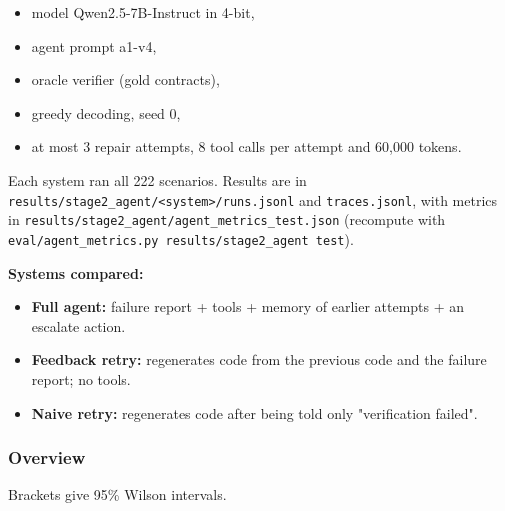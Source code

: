 \documentclass[11pt]{article}
\providecommand{\tightlist}{\setlength{\itemsep}{0pt}\setlength{\parskip}{0pt}}
\begin{document}
\begin{itemize}
\tightlist
\item
  model Qwen2.5-7B-Instruct in 4-bit,
\item
  agent prompt a1-v4,
\item
  oracle verifier (gold contracts),
\item
  greedy decoding, seed 0,
\item
  at most 3 repair attempts, 8 tool calls per attempt and 60,000 tokens.
\end{itemize}

Each system ran all 222 scenarios. Results are in
\texttt{results/\allowbreak{}stage2\_\allowbreak{}agent/\allowbreak{}<system>/\allowbreak{}runs.\allowbreak{}jsonl}
and \texttt{traces.\allowbreak{}jsonl}, with metrics in
\texttt{results/\allowbreak{}stage2\_\allowbreak{}agent/\allowbreak{}agent\_\allowbreak{}metrics\_\allowbreak{}test.\allowbreak{}json}
(recompute with
\texttt{eval/\allowbreak{}agent\_\allowbreak{}metrics.\allowbreak{}py results/\allowbreak{}stage2\_\allowbreak{}agent test}).

\textbf{Systems compared:}

\begin{itemize}
\tightlist
\item
  \textbf{Full agent:} failure report + tools + memory of earlier
  attempts + an escalate action.
\item
  \textbf{Feedback retry:} regenerates code from the previous code and
  the failure report; no tools.
\item
  \textbf{Naive retry:} regenerates code after being told only
  "verification failed".
\end{itemize}

\subsubsection{Overview}

Brackets give 95\% Wilson intervals.
\end{document}
